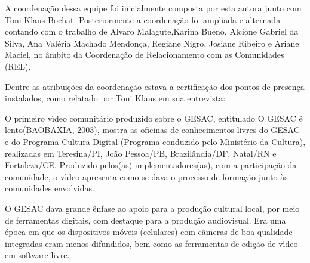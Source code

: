 \documentclass[
12pt,		%
openright,	%
twoside,  %
a4paper,			%
chapter=TITLE,		%
english,			%
french,				%
spanish,			%
brazil				%
]{USPSC-classe/USPSC}
\begin{document}
A coordena\c{c}\~ao dessa equipe foi inicialmente composta por esta autora junto com Toni Klaus Bochat. Posteriormente a coordena\c{c}\~ao foi ampliada e alternada contando com o trabalho de Alvaro Malagute,Karina Bueno, Alcione Gabriel da Silva, Ana Val\'eria Machado Mendon\c{c}a, Regiane Nigro, Josiane Ribeiro e Ariane Maciel, no \^ambito da Coordena\c{c}\~ao de  Relacionamento com as Comunidades (REL).










Dentre as atribui\c{c}\~oes da coordena\c{c}\~ao estava a certifica\c{c}\~ao dos pontos de presen\c{c}a instalados, como relatado por Toni Klaus em sua entrevista:











\noindent\begin{center}\mbox{\centering{}}\end{center}


O primeiro v\'{\i}deo comunit\'ario produzido sobre o GESAC, entitulado \textquotedbl O GESAC \'e lento\textquotedbl   (BAOBAXIA, 2003),  mostra as oficinas de conhecimentos livres do GESAC e do Programa Cultura Digital (Programa conduzido pelo Minist\'erio da Cultura), realizadas em Teresina/PI, Jo\~ao Pessoa/PB, Brazil\^andia/DF, Natal/RN e Fortaleza/CE. Produzido pelos(as) implementadores(as), com a participa\c{c}\~ao da comunidade, o v\'{\i}deo apresenta como se dava o processo de forma\c{c}\~ao junto \`as comunidades envolvidas.










O GESAC dava grande \^enfase ao apoio para a produ\c{c}\~ao cultural local, por meio de ferramentas digitais, com destaque para a produ\c{c}\~ao audiovisual. Era uma \'epoca em que os dispositivos m\'oveis (celulares) com c\^ameras de boa qualidade integradas eram menos difundidos, bem como as ferramentas de edi\c{c}\~ao de v\'{\i}deo em software livre.
\end{document}
